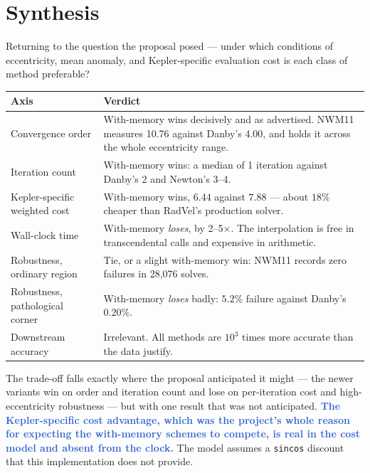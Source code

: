 \documentclass[11pt,a4paper]{article}
\newcommand{\key}[1]{\textcolor{Highlight}{\bfseries #1}}
\begin{document}
\section{Synthesis}

Returning to the question the proposal posed --- under which conditions of
eccentricity, mean anomaly, and Kepler-specific evaluation cost is each
class of method preferable?

\begin{center}
\small
\begin{tabularx}{\textwidth}{@{}>{\raggedright\arraybackslash}p{2.4cm} >{\raggedright\arraybackslash}X@{}}
\toprule
\textbf{Axis} & \textbf{Verdict} \\
\midrule
Convergence order & With-memory wins decisively and as advertised. NWM11 measures 10.76 against Danby's 4.00, and holds it across the whole eccentricity range. \\
Iteration count & With-memory wins: a median of 1 iteration against Danby's 2 and Newton's 3--4. \\
Kepler-specific weighted cost & With-memory wins, $6.44$ against $7.88$ --- about $18\%$ cheaper than RadVel's production solver. \\
Wall-clock time & With-memory \emph{loses}, by 2--5$\times$. The interpolation is free in transcendental calls and expensive in arithmetic. \\
Robustness, ordinary region & Tie, or a slight with-memory win: NWM11 records zero failures in 28{,}076 solves. \\
Robustness, pathological corner & With-memory \emph{loses} badly: $5.2\%$ failure against Danby's $0.20\%$. \\
Downstream accuracy & Irrelevant. All methods are $10^{3}$ times more accurate than the data justify. \\
\bottomrule
\end{tabularx}
\end{center}

The trade-off falls exactly where the proposal anticipated it might --- the
newer variants win on order and iteration count and lose on per-iteration
cost and high-eccentricity robustness --- but with one result that was not
anticipated. \key{The Kepler-specific cost advantage, which was the
project's whole reason for expecting the with-memory schemes to compete,
is real in the cost model and absent from the clock.} The model assumes a
\texttt{sincos} discount that this implementation does not provide.
\end{document}
